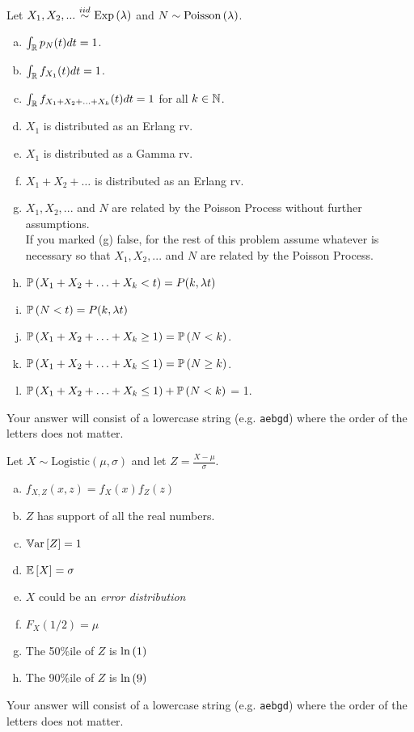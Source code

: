\documentclass[12pt,landscape]{article}
\newcommand{\instr}{\small Your answer will consist of a lowercase string (e.g. \texttt{aebgd}) where the order of the letters does not matter. \normalsize}
\begin{document}

\problem{} Let $X_1, X_2, ... \iid \exponential{\lambda}$ and $N \sim \mathrm{Poisson}\left(\lambda\right)$.

\vspace{-0.2cm}\benum{} 

\begin{enumerate}[(a)]
\item $\int_{\mathbb{R}} p_N(t) dt = 1$.
\item $\int_{\mathbb{R}} f_{X_1}(t) dt = 1$.
\item $\int_{\mathbb{R}} f_{X_1 + X_2 + \ldots + X_k}(t) dt = 1$ for all $k \in \mathbb{N}$.
\item $X_1$ is distributed as an Erlang rv.
\item $X_1$ is distributed as a Gamma rv.
\item $X_1 + X_2 + \ldots $ is distributed as an Erlang rv.
\item $X_1, X_2, ...$ and $N$ are related by the Poisson Process without further assumptions.\\

If you marked (g) false, for the rest of this problem assume whatever is necessary so that $X_1, X_2, ...$ and $N$ are related by the Poisson Process.

\item $\mathbb{P}\left(X_1 + X_2 + \ldots + X_k < t\right) = P(k, \lambda t)$
\item $\mathbb{P}\left(N < t\right) = P(k, \lambda t)$ %
\item $\mathbb{P}\left(X_1 + X_2 + \ldots + X_k \geq 1\right) = \mathbb{P}\left(N < k\right)$.
\item $\mathbb{P}\left(X_1 + X_2 + \ldots + X_k \leq 1\right) = \mathbb{P}\left(N \geq k\right)$.
\item $\mathbb{P}\left(X_1 + X_2 + \ldots + X_k \leq 1\right) + \mathbb{P}\left(N < k\right)$ = 1.
\end{enumerate}
\eenum\instr\pagebreak


\problem{} Let $X \sim \text{Logistic}(\mu, \sigma)$ and let $Z = \frac{X - \mu}{\sigma}$.

\vspace{-0.2cm}\benum{} 

\begin{enumerate}[(a)]
\item $f_{X,Z}(x,z) = f_X(x) f_Z(z)$
\item $Z$ has support of all the real numbers.
\item $\mathbb{V}\text{ar}\left[Z\right] = 1$
\item $\mathbb{E}\left[X\right] = \sigma$
\item $X$ could be an \emph{error distribution}
\item $F_X(1/2) = \mu$
\item The 50\%ile of $Z$ is $\ln\left(1\right)$
\item The 90\%ile of $Z$ is $\ln\left(9\right)$
\end{enumerate}
\eenum\instr\pagebreak
\end{document}
